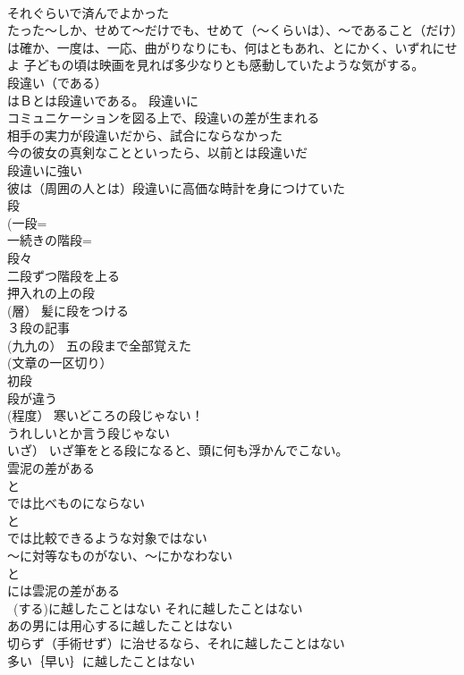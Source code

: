 \documentclass[8pt]{extreport}
\begin{document}
\begin{CJK}{UTF8}{min}
\\	それぐらいで済んでよかった	
\\	たった～しか、せめて～だけでも、せめて（～くらいは）、～であること（だけ）は確か、一度は、一応、曲がりなりにも、何はともあれ、とにかく、いずれにせよ 子どもの頃は映画を見れば多少なりとも感動していたような気がする。 
\\	段違い（である） 
\\	はＢとは段違いである。 段違いに
\\	コミュニケーションを図る上で、段違いの差が生まれる 
\\	相手の実力が段違いだから、試合にならなかった 
\\	今の彼女の真剣なことといったら、以前とは段違いだ 
\\	段違いに強い 
\\	彼は（周囲の人とは）段違いに高価な時計を身につけていた 
\\	段　
\\	(一段=
\\	一続きの階段= 
\\	段々 
\\	二段ずつ階段を上る 
\\	押入れの上の段 
\\	(層） 髪に段をつける 
\\	３段の記事 
\\	(九九の） 五の段まで全部覚えた 
\\	(文章の一区切り） 
\\	初段 
\\	段が違う　
\\	(程度） 寒いどころの段じゃない！ 
\\	うれしいとか言う段じゃない 
\\	いざ） いざ筆をとる段になると、頭に何も浮かんでこない。 
\\	雲泥の差がある 
\\	と
\\	では比べものにならない 
\\	と
\\	では比較できるような対象ではない　　
\\	～に対等なものがない、～にかなわない 
\\	と
\\	には雲泥の差がある
\\	~(する)に越したことはない それに越したことはない	
\\	あの男には用心するに越したことはない 
\\	切らず（手術せず）に治せるなら、それに越したことはない　
\\	多い｛早い｝に越したことはない 

\end{CJK}
\end{document}
